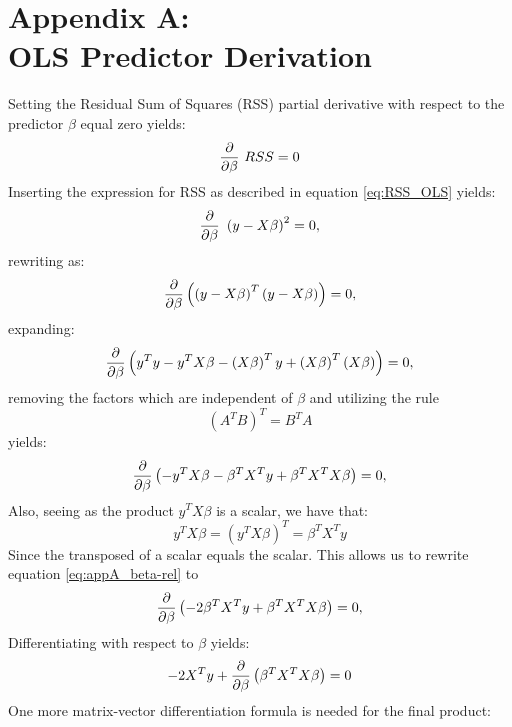 \section*{Appendix A:\\OLS Predictor Derivation}
    Setting the Residual Sum of Squares (RSS) partial derivative with respect to the predictor $\beta$ equal zero yields:
    \begin{equation}
        \pdv{}{\beta}\ RSS = 0
    \end{equation}
    Inserting the expression for RSS as described in equation \ref{eq:RSS_OLS} yields:
    \begin{equation}
        \pdv{}{\beta}\ \left( y - X \beta \right)^2 = 0,
    \end{equation}
    rewriting as:
    \begin{equation}
        \pdv{}{\beta}\left( \left( y - X \beta \right)^T\left( y - X \beta \right)\right) = 0,
    \end{equation}
    expanding:
    \begin{equation}
        \pdv{}{\beta}\left( y^Ty - y^TX\beta - \left( X\beta \right)^Ty + \left( X\beta \right)^T\left( X\beta \right) \right) = 0,
    \end{equation}
    removing the factors which are independent of $\beta$ and utilizing the rule
    \begin{equation}
        \left( A^TB \right)^T = B^TA
    \end{equation}
    yields:
    \begin{equation}\label{eq:appA_beta-rel}
        \pdv{}{\beta}\left(- y^TX\beta - \beta^TX^T y + \beta^TX^TX\beta \right) = 0,
    \end{equation}
    Also, seeing as the product $y^TX\beta$ is a scalar, we have that:
    \begin{equation}
        y^TX\beta = \left( y^TX\beta \right)^T = \beta^TX^Ty
    \end{equation}
    Since the transposed of a scalar equals the scalar. This allows us to rewrite equation \ref{eq:appA_beta-rel} to
    \begin{equation}
        \pdv{}{\beta}\left(- 2 \beta^TX^T y + \beta^TX^TX\beta \right) = 0,
    \end{equation}
    Differentiating with respect to $\beta$ yields:
    \begin{equation}
        -2 X^Ty + \pdv{}{\beta} \left( \beta^TX^TX\beta \right) = 0
    \end{equation}
    One more matrix-vector differentiation formula is needed for the final product:
